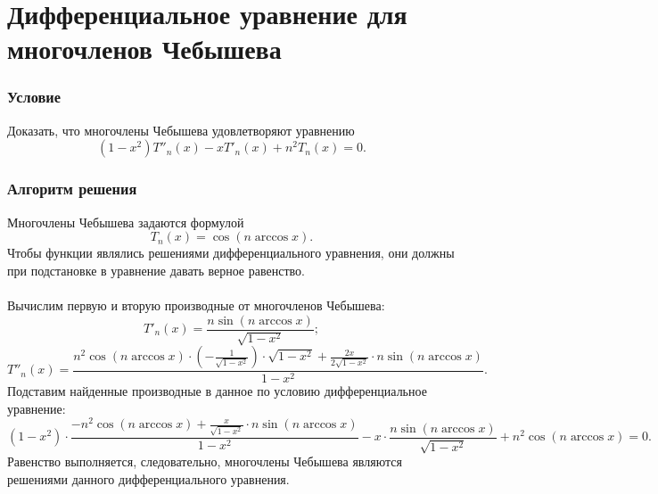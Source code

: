 \documentclass[a4paper, 12pt]{article}
\begin{document}
	\section*{Дифференциальное уравнение для многочленов Чебышева}
	\subsubsection*{Условие}
	Доказать, что многочлены Чебышева удовлетворяют уравнению $$(1-x^2)T''_n(x) - xT'_n(x) + n^2 T_n(x)=0.$$
	\subsubsection*{Алгоритм решения}
	Многочлены Чебышева задаются формулой $$T_n(x) = \cos (n\arccos x).$$
	Чтобы функции являлись решениями дифференциального уравнения, они должны при подстановке в уравнение давать верное равенство. \\\\
	Вычислим первую и вторую производные от многочленов Чебышева:
	$$T'_n(x) = \dfrac{n \sin (n\arccos x)}{\sqrt{1-x^2}};$$
	$$T''_n(x) = \dfrac{n^2\cos (n\arccos x) \cdot (-\frac{1}{\sqrt{1-x^2}})\cdot \sqrt{1-x^2} + \frac{2x}{2\sqrt{1-x^2}} \cdot n \sin (n\arccos x)}{1-x^2}.$$
	Подставим найденные производные в данное по условию дифференциальное уравнение:
	$$(1-x^2)\cdot \dfrac{-n^2\cos (n\arccos x) + \frac{x}{\sqrt{1-x^2}} \cdot n \sin (n\arccos x)}{1-x^2} -x\cdot \dfrac{n \sin (n\arccos x)}{\sqrt{1-x^2}} + n^2 \cos(n\arccos x) = 0.$$
	Равенство выполняется, следовательно, многочлены Чебышева являются решениями данного дифференциального уравнения.
\end{document}
